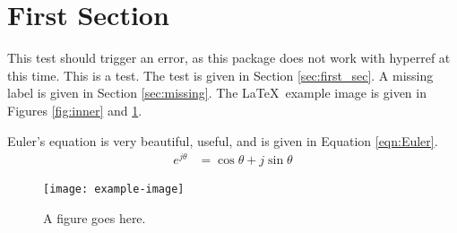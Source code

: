 \documentclass{article}
\begin{document}
\section{First Section\label{sec:first_sec}}
This test should trigger an error, as this package does not work with hyperref at this time.
This is a test. 
The test is given in Section \ref{sec:first_sec}.
A missing label is given in Section \ref{sec:missing}.
The \LaTeX~example image is given in Figures \ref{fig:inner} and \ref{fig:outer}.

Euler's equation is very beautiful, useful, and is given in Equation \ref{eqn:Euler}.
\begin{align}
  e^{j\theta} &= \cos\theta+j\sin\theta \label{eqn:Euler}
\end{align}
\begin{figure}[b]
  \centering
  \texttt{[image: example-image]}
  \caption{A figure goes here.\label{fig:inner}}\label{fig:outer}
\end{figure}

\end{document}
